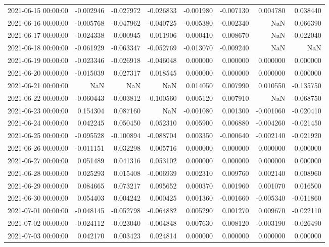 \begin{tabular}{lrrrrrrr}
2021-06-15 00:00:00 & -0.002946 & -0.027972 & -0.026833 & -0.001980 & -0.007130 & 0.004780 & 0.038440 \\
2021-06-16 00:00:00 & -0.005768 & -0.047962 & -0.040725 & -0.005380 & -0.002340 & NaN & 0.066390 \\
2021-06-17 00:00:00 & -0.024338 & -0.000945 & 0.011906 & -0.000410 & 0.008670 & NaN & -0.022040 \\
2021-06-18 00:00:00 & -0.061929 & -0.063347 & -0.052769 & -0.013070 & -0.009240 & NaN & NaN \\
2021-06-19 00:00:00 & -0.023346 & -0.026918 & -0.046048 & 0.000000 & 0.000000 & 0.000000 & 0.000000 \\
2021-06-20 00:00:00 & -0.015039 & 0.027317 & 0.018545 & 0.000000 & 0.000000 & 0.000000 & 0.000000 \\
2021-06-21 00:00:00 & NaN & NaN & NaN & 0.014050 & 0.007990 & 0.010550 & -0.135750 \\
2021-06-22 00:00:00 & -0.060443 & -0.003812 & -0.100560 & 0.005120 & 0.007910 & NaN & -0.068750 \\
2021-06-23 00:00:00 & 0.154304 & 0.087160 & NaN & -0.001080 & 0.001300 & -0.001060 & -0.020410 \\
2021-06-24 00:00:00 & 0.042245 & 0.050450 & 0.052310 & 0.005900 & 0.006880 & -0.004260 & -0.021450 \\
2021-06-25 00:00:00 & -0.095528 & -0.100894 & -0.088704 & 0.003350 & -0.000640 & -0.002140 & -0.021920 \\
2021-06-26 00:00:00 & -0.011151 & 0.032298 & 0.005716 & 0.000000 & 0.000000 & 0.000000 & 0.000000 \\
2021-06-27 00:00:00 & 0.051489 & 0.041316 & 0.053102 & 0.000000 & 0.000000 & 0.000000 & 0.000000 \\
2021-06-28 00:00:00 & 0.025293 & 0.015408 & -0.006939 & 0.002310 & 0.009760 & 0.002140 & 0.008960 \\
2021-06-29 00:00:00 & 0.084665 & 0.073217 & 0.095652 & 0.000370 & 0.001960 & 0.001070 & 0.016500 \\
2021-06-30 00:00:00 & 0.054403 & 0.004242 & 0.000425 & 0.001360 & -0.001660 & -0.005340 & -0.011860 \\
2021-07-01 00:00:00 & -0.048145 & -0.052798 & -0.064882 & 0.005290 & 0.001270 & 0.009670 & -0.022110 \\
2021-07-02 00:00:00 & -0.024112 & -0.023040 & -0.004848 & 0.007630 & 0.008120 & -0.003190 & -0.026490 \\
2021-07-03 00:00:00 & 0.042170 & 0.003423 & 0.024814 & 0.000000 & 0.000000 & 0.000000 & 0.000000 \\

\end{tabular}

